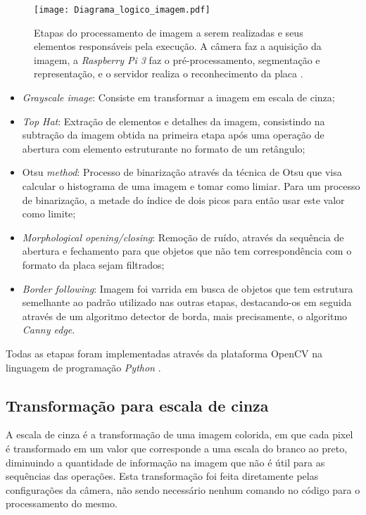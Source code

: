 \begin{figure}[H]
    \centering
    \texttt{[image: Diagrama\_logico\_imagem.pdf]}
    \caption{Etapas do processamento de imagem a serem realizadas e seus elementos responsáveis pela execução. A câmera faz a aquisição da imagem, a \emph{Raspberry Pi 3} faz o pré-processamento, segmentação e representação, e o servidor realiza o reconhecimento da placa \cite{yepez2018improved}.} 
    \label{processamento_imagem}
\end{figure}

\begin{itemize}
    \item \emph{Grayscale image}: Consiste em transformar a imagem em escala de cinza;
    \item \emph{Top Hat}: Extração de elementos e detalhes da imagem, consistindo na subtração da imagem obtida na primeira etapa após uma operação de abertura com elemento estruturante no formato de um retângulo;
    \item Otsu \emph{method}: Processo de binarização através da técnica de Otsu que visa calcular o histograma de uma imagem e tomar como limiar. Para um processo de binarização, a metade do índice de dois picos para então usar este valor como limite; 
    \item \emph{Morphological opening/closing}: Remoção de ruído, através da sequência de abertura e fechamento para que objetos que não tem correspondência com o formato da placa sejam filtrados; 
    \item \emph{Border following}: Imagem foi varrida em busca de objetos que tem estrutura semelhante ao padrão utilizado nas outras etapas, destacando-os em seguida através de um algoritmo detector de borda, mais precisamente, o algoritmo \emph{Canny edge}. 
\end{itemize}
    
Todas as etapas foram implementadas através da plataforma OpenCV na linguagem de programação \textit{Python} \cite{yepez2018improved}\cite{gonzalez2007digital}.


\subsection{Transformação para escala de cinza}

A escala de cinza é a transformação de uma imagem colorida, em que cada pixel é transformado em um valor que corresponde a uma escala do branco ao preto, diminuindo a quantidade de informação na imagem que não é útil para as sequências das operações. Esta transformação foi feita diretamente pelas configurações da câmera, não sendo necessário nenhum comando no código para o processamento do mesmo. 

